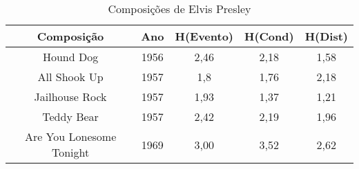 \begin{table}[]
\centering
\caption{Composições de Elvis Presley}
\begin{tabular}{|c|c|c|c|c|}
\hline
\rowcolor[HTML]{9B9B9B} 
{\color[HTML]{FFFFFF} Composição} & {\color[HTML]{FFFFFF} Ano} & {\color[HTML]{FFFFFF} H(Evento)} & {\color[HTML]{FFFFFF} H(Cond)} & {\color[HTML]{FFFFFF} H(Dist)} \\ \hline
Hound Dog                         & 1956                       & 2,46                             & 2,18                           & 1,58                           \\ \hline
All Shook Up                      & 1957                       & 1,8                              & 1,76                           & 2,18                           \\ \hline
Jailhouse Rock                    & 1957                       & 1,93                             & 1,37                           & 1,21                           \\ \hline
Teddy Bear                        & 1957                       & 2,42                             & 2,19                           & 1,96                           \\ \hline
Are You Lonesome Tonight          & 1969                       & 3,00                             & 3,52                           & 2,62                           \\ \hline
\end{tabular}
\end{table}


